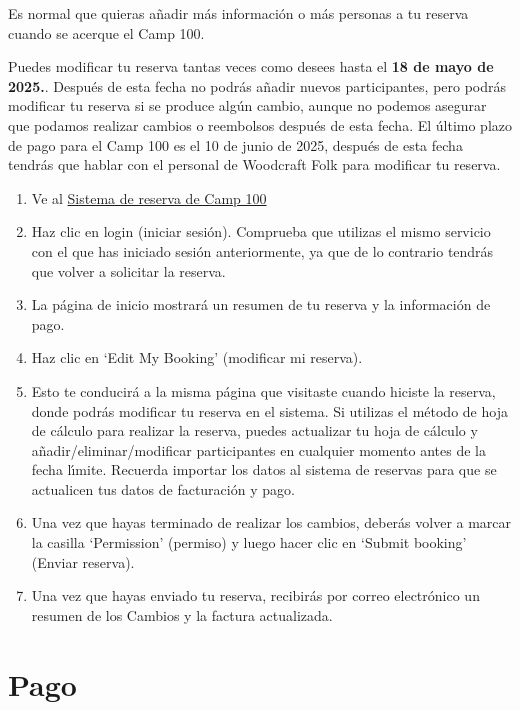 \documentclass[a4paper, 11pt]{report}
\begin{document}
Es normal que quieras a\~nadir m\'as informaci\'on o m\'as personas a tu reserva cuando se acerque el Camp 100. 

Puedes modificar tu reserva tantas veces como desees hasta el \textbf{18 de mayo de 2025.}. Despu\'es de esta fecha no podr\'as a\~nadir nuevos participantes, pero podr\'as modificar tu reserva si se produce alg\'un cambio, aunque no podemos asegurar que podamos realizar cambios o reembolsos despu\'es de esta fecha. El \'ultimo plazo de pago para el Camp 100 es el 10 de junio de 2025, despu\'es de esta fecha tendr\'as que hablar con el personal de Woodcraft Folk para modificar tu reserva. 
 
\begin{enumerate}
    \item Ve al \href{https://bookings.camp100.org.uk}{Sistema de reserva de Camp 100}
    \item Haz clic en login (iniciar sesi\'on). Comprueba que utilizas el mismo servicio con el que has iniciado sesi\'on anteriormente, ya que de lo contrario tendr\'as que volver a solicitar la reserva.    
    \item La p\'agina de inicio mostrar\'a un resumen de tu reserva y la informaci\'on de pago.
    \item Haz clic en `Edit My Booking' (modificar mi reserva).
    \item Esto te conducir\'a a la misma p\'agina que visitaste cuando hiciste la reserva, donde podr\'as modificar tu reserva en el sistema. Si utilizas el m\'etodo de hoja de c\'alculo para realizar la reserva, puedes actualizar tu hoja de c\'alculo y a\~nadir/eliminar/modificar participantes en cualquier momento antes de la fecha l\'{\i}mite. Recuerda importar los datos al sistema de reservas para que se actualicen tus datos de facturaci\'on y pago.
    \item Una vez que hayas terminado de realizar los cambios, deber\'as volver a marcar la casilla `Permission' (permiso) y luego hacer clic en `Submit booking' (Enviar reserva).
    \item Una vez que hayas enviado tu reserva, recibir\'as por correo electr\'onico un resumen de los Cambios y la factura actualizada.
    
\end{enumerate}

\chapter{Pago}
\label{chap:payment}
\end{document}
